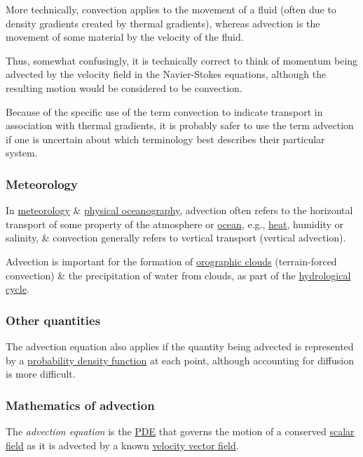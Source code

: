 \documentclass{article}
\begin{document}
More technically, convection applies to the movement of a fluid (often due to density gradients created by thermal gradients), whereas advection is the movement of some material by the velocity of the fluid.

Thus, somewhat confusingly, it is technically correct to think of momentum being advected by the velocity field in the Navier-Stokes equations, although the resulting motion would be considered to be convection.

Because of the specific use of the term convection to indicate transport in association with thermal gradients, it is probably safer to use the term advection if one is uncertain about which terminology best describes their particular system.

\subsubsection{Meteorology}
In \href{https://en.wikipedia.org/wiki/Meteorology}{meteorology} \& \href{https://en.wikipedia.org/wiki/Physical_oceanography}{physical oceanography}, advection often refers to the horizontal transport of some property of the atmosphere or \href{https://en.wikipedia.org/wiki/Ocean}{ocean}, e.g., \href{https://en.wikipedia.org/wiki/Heat}{heat}, humidity or salinity, \& convection generally refers to vertical transport (vertical advection).

Advection is important for the formation of \href{https://en.wikipedia.org/wiki/Orographic_cloud}{orographic clouds} (terrain-forced convection) \& the precipitation of water from clouds, as part of the \href{https://en.wikipedia.org/wiki/Hydrological_cycle}{hydrological cycle}.

\subsubsection{Other quantities}
The advection equation also applies if the quantity being advected is represented by a \href{https://en.wikipedia.org/wiki/Probability_density_function}{probability density function} at each point, although accounting for diffusion is more difficult.

\subsubsection{Mathematics of advection}
The {\it advection equation} is the \href{https://en.wikipedia.org/wiki/Partial_differential_equation}{PDE} that governs the motion of a conserved \href{https://en.wikipedia.org/wiki/Scalar_field}{scalar field} as it is advected by a known \href{https://en.wikipedia.org/wiki/Velocity_field}{velocity vector field}.
\end{document}
